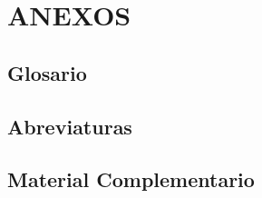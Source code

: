 \chapter{ANEXOS}\label{ch:anexos}

\section{Glosario}\label{sec:anexos-glosario}

\section{Abreviaturas}\label{sec:anexos-abreviaturas}

\section{Material Complementario}\label{sec:anexos-complementario}